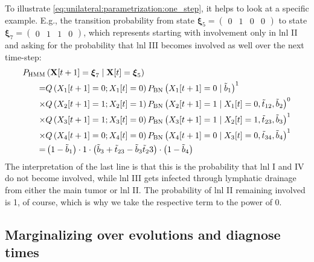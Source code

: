 \documentclass[\relativeRoot/main.tex]{subfiles}
\begin{document}
To illustrate \cref{eq:unilateral:parametrization:one_step}, it helps to look at a specific example. E.g., the transition probability from state $\boldsymbol{\xi}_5 = \begin{pmatrix} 0 & 1 & 0 & 0 \end{pmatrix}$ to state $\boldsymbol{\xi}_7 = \begin{pmatrix} 0 & 1 & 1 & 0 \end{pmatrix}$, which represents starting with involvement only in \gls{lnl} II and asking for the probability that \gls{lnl} III becomes involved as well over the next time-step:
%
\begin{equation}
    \begin{aligned}
        P_\text{HMM} &\left( \mathbf{X}[t+1] = \boldsymbol{\xi}_7 \mid \mathbf{X}[t] = \boldsymbol{\xi}_5 \right) \\
        = &Q \left( X_1[t+1] = 0; X_1[t] = 0 \right) P_\text{BN} \left( X_1[t+1] = 0 \mid \Tilde{b}_1 \right)^1 \\
        \times &Q \left( X_2[t+1] = 1; X_2[t] = 1 \right) P_\text{BN} \left( X_2[t+1] = 1 \mid X_1[t] = 0, \Tilde{t}_{12}, \Tilde{b}_2 \right)^0 \\
        \times &Q \left( X_3[t+1] = 1; X_3[t] = 0 \right) P_\text{BN} \left( X_3[t+1] = 1 \mid X_2[t] = 1, \Tilde{t}_{23}, \Tilde{b}_3 \right)^1 \\
        \times &Q \left( X_4[t+1] = 0; X_4[t] = 0 \right) P_\text{BN} \left( X_4[t+1] = 0 \mid X_3[t] = 0, \Tilde{t}_{34}, \Tilde{b}_4 \right)^1 \\
        = &\left( 1 - \Tilde{b}_1 \right) \cdot 1 \cdot \left( \Tilde{b}_3 + \Tilde{t}_{23} - \Tilde{b}_3 \Tilde{t}_23 \right) \cdot \left( 1 - \Tilde{b}_4 \right)
    \end{aligned}
\end{equation}
%
The interpretation of the last line is that this is the probability that \gls{lnl} I and IV do not become involved, while \gls{lnl} III gets infected through lymphatic drainage from either the main tumor or \gls{lnl} II. The probability of \gls{lnl} II remaining involved is 1, of course, which is why we take the respective term to the power of 0.

\subsection{Marginalizing over evolutions and diagnose times}
\label{subsec:unilateral:formalism:marginalizing}
\end{document}
